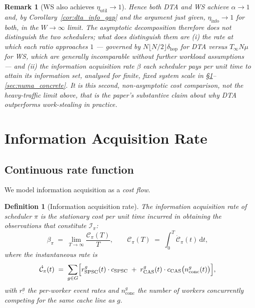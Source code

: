 \documentclass[11pt,a4paper]{article}
\newtheorem{definition}{Definition}[section]
\newtheorem{remark}{Remark}[section]
\begin{document}
\begin{remark}[WS also achieves $\eta_{\mathrm{util}}\to 1$]
Hence \emph{both} DTA and WS achieve $\alpha \to 1$ and, by
Corollary~\ref{cor:dta_info_gap} and the argument just given,
$\eta_{\mathrm{info}} \to 1$ for both, in the $W \to \infty$ limit. The
asymptotic decomposition therefore does \emph{not} distinguish the two
schedulers; what does distinguish them are (i) the \emph{rate} at which
each ratio approaches $1$ --- governed by $N\lfloor N/2\rfloor\delta_{\mathrm{hop}}$
for DTA versus $T_\infty N\mu$ for WS, which are generally incomparable
without further workload assumptions --- and (ii) the information
acquisition rate $\beta$ each scheduler pays \emph{per unit time} to
attain its information set, analysed for finite, fixed system scale in
\S\ref{sec:info_cost}--\ref{sec:numa_concrete}. It is this second,
non-asymptotic cost comparison, not the heavy-traffic limit above, that
is the paper's substantive claim about why DTA outperforms
work-stealing in practice.
\end{remark}

\section{Information Acquisition Rate}
\label{sec:info_cost}

\subsection{Continuous rate function}

We model information acquisition as a \emph{cost flow}.

\begin{definition}[Information acquisition rate]\label{def:beta}
The \emph{information acquisition rate} of scheduler $\pi$ is the
stationary cost per unit time incurred in obtaining the observations that
constitute $\mathcal{I}_\pi$:
\begin{equation}\label{eq:beta_def}
  \beta_\pi
  \;=\;
  \lim_{T\to\infty}
  \frac{\mathcal{C}_\pi(T)}{T},
  \qquad
  \mathcal{C}_\pi(T)
  \;=\;
  \int_0^T \dot{\mathcal{C}}_\pi(t)\,\mathrm{d}t,
\end{equation}
where the instantaneous rate is
\begin{equation}\label{eq:cdot}
  \dot{\mathcal{C}}_\pi(t)
  \;=\;
  \sum_{g \in G}
  \Bigl[
    r_{\mathrm{SPSC}}^g(t)\cdot c_{\mathrm{SPSC}}
    \;+\;
    r_{\mathrm{CAS}}^g(t)\cdot c_{\mathrm{CAS}}\bigl(n_{\mathrm{conc}}^g(t)\bigr)
  \Bigr],
\end{equation}
with $r^g_{\cdot}$ the per-worker event rates and $n_{\mathrm{conc}}^g$
the number of workers concurrently competing for the same cache line as $g$.
\end{definition}
\end{document}
